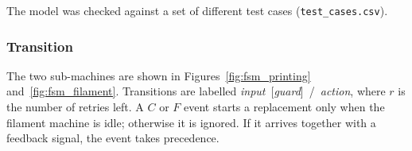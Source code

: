 \begin{table}[H]
\small
\centering
\caption{Snapshot of the state transition table (state names abbreviated, \texttt{X} is a \texttt{DON'T CARE}, empty cells mean no signal).}
\label{tab:fsm_table}
\end{table}

The model was checked against a set of different test cases (\texttt{test\_cases.csv}).

\subsubsection{Transition }
\label{subsubsec:fsm_}

The two sub-machines are shown in Figures~\ref{fig:fsm_printing} and~\ref{fig:fsm_filament}. Transitions are labelled \emph{input}~[\emph{guard}]~/~\emph{action}, where $r$ is the number of retries left. A $C$ or $F$ event starts a replacement only when the filament machine is idle; otherwise it is ignored. If it arrives together with a feedback signal, the event takes precedence.


